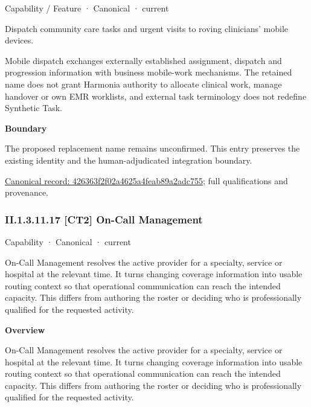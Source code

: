 \label{element:426363f2f02a4625a4feab89a2adc755}
{\small Capability / Feature · Canonical · current}\par

Dispatch community care tasks and urgent visits to roving clinicians' mobile devices.



Mobile dispatch exchanges externally established assignment, dispatch and progression information with business mobile-work mechanisms. The retained name does not grant Harmonia authority to allocate clinical work, manage handover or own EMR worklists, and external task terminology does not redefine Synthetic Task.



\textbf{Boundary}



The proposed replacement name remains unconfirmed. This entry preserves the existing identity and the human-adjudicated integration boundary.


{\footnotesize \href{../../../../continuum/strategy/capability/feature/426363f2f02a4625a4feab89a2adc755.md}{Canonical record: 426363f2f02a4625a4feab89a2adc755}; full qualifications and provenance.}\par
\subsubsection*{II.1.3.11.17 [CT2] On-Call Management}
\label{navigation:II.1.3.11.17}

\label{element:b16cef8f2bfd4b92948ec75cbcfa7b9a}
{\small Capability · Canonical · current}\par

On-Call Management resolves the active provider for a specialty, service or hospital at the relevant time. It turns changing coverage information into usable routing context so that operational communication can reach the intended capacity. This differs from authoring the roster or deciding who is professionally qualified for the requested activity.



\textbf{Overview}



On-Call Management resolves the active provider for a specialty, service or hospital at the relevant time. It turns changing coverage information into usable routing context so that operational communication can reach the intended capacity. This differs from authoring the roster or deciding who is professionally qualified for the requested activity.



